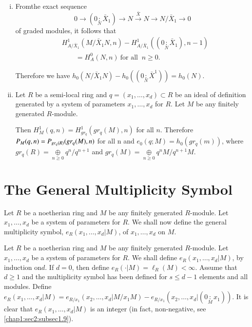 \begin{remark*}
~
\begin{enumerate} [(ii)]
\item From\pageoriginale the exact sequence
  $$
  0 \to \left(0 \underset{N}{:}\bar{X}_1\right) \to N
  \xrightarrow{\bar{X}} N \to  N/\bar{X}_1 \to 0 
  $$
  of graded modules, it follows that
  \begin{align*}
  & H^1_{A/\bar{X}_1} (M/\bar{X}_1 N, n) - H^1_{A/\bar{X}_1} \left(\left( 0
  \underset{N}{:} \bar{X}_1\right), n-1\right)\\
  &\qquad  = H^0_A (N, n) ~\text {
    for all }~ n \geq 0.  
  \end{align*}
  
  Therefore we have $h_0 (N/\bar{X}_1 N) - h_0 \left((0 \underset{N}{:}
  \bar{X}^1)\right) = h_0 (N)$. 
\item Let $R$ be a semi-local ring and $q = (x_1, \ldots, x_d) \subset
  R$ be an ideal of definition generated by a system of parameters
  $x_1, \ldots,  x_d$ for $R$. Let $M$ be any finitely generated
  $R$-module.  
  
  Then $H^1_M (q, n) = H^1_{gr_q}(gr_q (M),n)$ for all $n$. Therefore
  $P_M (q, n)\break = P_{gr_q(R)} (gr_q (M), n)$ for all n and $e_0 (q; M) =
  h_0 (gr_q (m))$, where $gr_q (R) = \underset{n \geq 0}{\oplus}
  q^n/q^{n+1} $ and $gr_q (M) = \underset{n \geq 0}{\oplus} q^n
  M/q^{n+1}M$. 
\end{enumerate}
\end{remark*}

\section{The General Multiplicity Symbol}\label{chap1:sec2}

Let $R$ be a noetherian ring and $M$ be any finitely generated
$R$-module. Let $x_1, \ldots, x_d$ be a system of parameters for $R$. We
shall now define the general multiplicity symbol, $e_R(x_1, \ldots,
x_d | M)$, of $x_1, \ldots, x_d $ on $M$. 

\setcounter{definition}{2}
\begin{definition}\label{chap1:sec2:def1.3}
  Let $R$ be a noetherian ring and $M$ be any finitely generated
  $R$-module. Let $x_1, \ldots, x_d$ be a system of parameters for $R$. We
  shall define $e_R (x_1, \ldots, x_d | M)$, by induction on\pageoriginale $d$. If
  $d=0$, then define $e_R(\cdot|M)=\ell_R(M)< \infty$. Assume that $d
  \geq 1$ and the multiplicity symbol has been defined for $s \leq d-1$
  elements and all modules. Define $e_R(x_1,\ldots,x_d |M) = e_{R/x_1}
  (x_2,\ldots,x_d |M/x_1M)-e_{R/x_1} (x_2,\ldots,x_d | (0
  \underset{M}{:} x_1 ))$. It is clear that $e_R (x_1,\ldots,x_d | M)$
  is an integer (in fact, non-negative, see \ref{chap1:sec2:subsec1.9}).
\end{definition}

